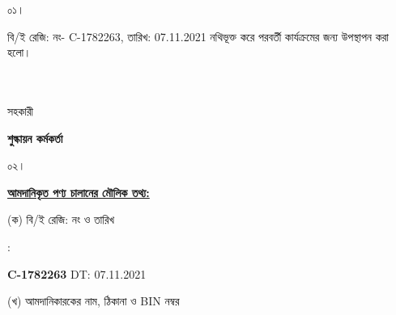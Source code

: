 \documentclass[12pt]{article}
\newcommand{\beno}{C-1782263}
\newcommand{\bedt}{07.11.2021}
\begin{document}
\noindent
\begin{minipage}[t]{0.05\linewidth}
০১।
\end{minipage}
\begin{minipage}[t]{0.95\linewidth}
বি/ই রেজি: নং- {\beno}, তারিখ: {\bedt}
নথিভূক্ত করে
পরবর্তী কার্যক্রমের জন্য উপস্থাপন করা হলো।
\\
\\
\\
\end{minipage}
\begin{minipage}[t]{0.05\linewidth}
\hspace*{1em}
\end{minipage}
\begin{minipage}[t]{0.05\linewidth}
সহকারী
\end{minipage}
\begin{minipage}[t]{0.40\linewidth}
\hspace{1em}
\end{minipage}
\begin{minipage}[t]{0.50\linewidth}
\textbf{শুল্কায়ন কর্মকর্তা}
\\
\end{minipage}
\begin{minipage}[t]{0.05\linewidth}
০২।
\end{minipage}
\begin{minipage}[t]{0.95\linewidth}
\underline{\textbf {আমদানিকৃত পণ্য চালানের
মৌলিক তথ্য:}}
\\
\end{minipage}
\footnotesize
\begin{minipage}[t]{0.05\linewidth}
\hspace*{1em}
\end{minipage}
\begin{minipage}[t]{0.45\linewidth}
(ক) বি/ই রেজি: নং ও তারিখ
\end{minipage}
\begin{minipage}[t]{0.02\linewidth}
:
\end{minipage}
\begin{minipage}[t]{0.50\linewidth}
\textbf{{\beno}} \hspace{2em} DT: {\bedt}
\\
\end{minipage}
\begin{minipage}[t]{0.05\linewidth}
\hspace*{1em}
\end{minipage}
\begin{minipage}[t]{0.45\linewidth}
(খ) আমদানিকারকের নাম, ঠিকানা
ও BIN নম্বর
\end{minipage}
\end{document}
